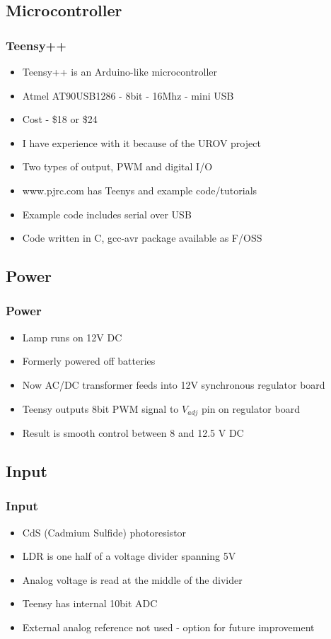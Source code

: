 \documentclass{beamer}
\begin{document}
\subsection{Microcontroller}
\frame
{
	\frametitle{Teensy++}
	\begin{itemize}
		\item Teensy++ is an Arduino-like microcontroller
		\item Atmel AT90USB1286 - 8bit - 16Mhz - mini USB
		\item Cost - \$18 or \$24 
		\item I have experience with it because of the UROV project
		\item Two types of output, PWM and digital I/O
		\item www.pjrc.com has Teenys and example code/tutorials
		\item Example code includes serial over USB
		\item Code written in C, gcc-avr package available as F/OSS
	\end{itemize}
}

\subsection{Power}
\frame
{
	\frametitle{Power}
	\begin{itemize}
		\item Lamp runs on 12V DC
		\item Formerly powered off batteries
		\item Now AC/DC transformer feeds into 12V synchronous regulator board
		\item Teensy outputs 8bit PWM signal to $V_{adj}$ pin on regulator board
		\item Result is smooth control between 8 and 12.5 V DC
	\end{itemize}
}

\subsection{Input}
\frame
{
	\frametitle{Input}
	\begin{itemize}
		\item CdS (Cadmium Sulfide) photoresistor 
		\item LDR is one half of a voltage divider spanning 5V
		\item Analog voltage is read at the middle of the divider
		\item Teensy has internal 10bit ADC
		\item External analog reference not used - option for future improvement
	\end{itemize}
}
\end{document}
